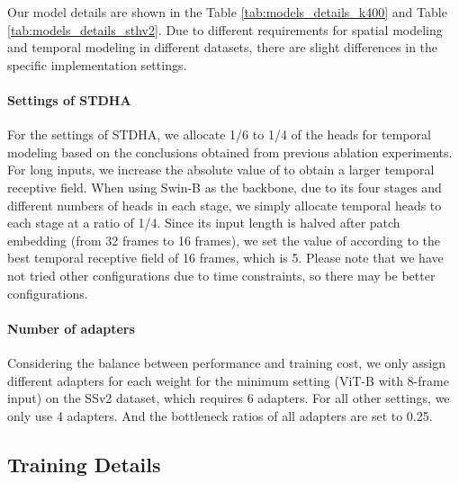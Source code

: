 %
 
Our model details are shown in the Table \ref{tab:models_details_k400} and Table \ref{tab:models_details_sthv2}. Due to different requirements for spatial modeling and temporal modeling in different datasets, there are slight differences in the specific implementation settings.

\paragraph{Settings of STDHA}
For the settings of STDHA, we allocate 1/6 to 1/4 of the heads for temporal modeling based on the conclusions obtained from previous ablation experiments. For long inputs, we increase the absolute value of  to obtain a larger temporal receptive field. When using Swin-B as the backbone, due to its four stages and different numbers of heads in each stage, we simply allocate temporal heads to each stage at a ratio of 1/4. Since its input length is halved after patch embedding (from 32 frames to 16 frames), we set the value of  according to the best temporal receptive field of 16 frames, which is 5. Please note that we have not tried other configurations due to time constraints, so there may be better configurations.

\paragraph{Number of adapters}
Considering the balance between performance and training cost, we only assign different adapters for each weight for the minimum setting (ViT-B with 8-frame input) on the SSv2 dataset, which requires 6 adapters. For all other settings, we only use 4 adapters. And the bottleneck ratios of all adapters are set to 0.25.

\subsection{Training Details}



